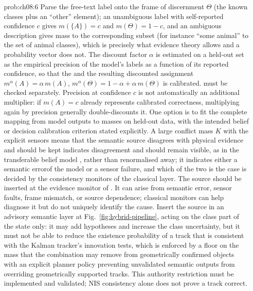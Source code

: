 \documentclass[graybox,envcountchap]{style/SNmono}
\providecommand{\DIFadd}[1]{{\protect\color{blue} #1}} %
\providecommand{\DIFdel}[1]{{\protect\color{red} #1}} %
\providecommand{\DIFaddbegin}{} %
\providecommand{\DIFaddend}{} %
\providecommand{\DIFdelbegin}{} %
\providecommand{\DIFdelend}{} %
\begin{document}
\begin{sol}{prob:ch08:6}
Parse the free-text label onto the frame of discernment $\Theta$ (the known classes plus an ``other'' element); an unambiguous label with self-reported confidence $c$ gives $m(\{A\})=c$ and $m(\Theta)=1-c$, and an ambiguous description gives mass to the corresponding subset (for instance ``some animal'' to the set of animal classes), which is precisely what evidence theory allows and a probability vector does not. The discount factor $\alpha$ is estimated on a held-out set as the empirical precision of the model's labels as a function of its reported confidence, \DIFdelbegin \DIFdel{so that the }\DIFdelend \DIFaddbegin \DIFadd{and the resulting }\DIFaddend discounted assignment $m^\alpha(A)=\alpha\,m(A)$, $m^\alpha(\Theta)=1-\alpha+\alpha\,m(\Theta)$ \DIFdelbegin \DIFdel{is calibrated. }\DIFdelend \DIFaddbegin \DIFadd{must be checked separately. Precision at confidence $c$ is not automatically an additional multiplier: if $m(A)=c$ already represents calibrated correctness, multiplying again by precision generally double-discounts it. One option is to fit the complete mapping from model outputs to masses on held-out data, with the intended belief or decision calibration criterion stated explicitly. }\DIFaddend A large conflict mass $K$ \DIFdelbegin \DIFdel{with the explicit sensors means that the semantic source disagrees with physical evidence and should be kept }\DIFdelend \DIFaddbegin \DIFadd{indicates disagreement and should remain }\DIFaddend visible, as in the transferable belief model\DIFdelbegin \DIFdel{, rather than renormalised away; it indicates either a semantic errorof the model or a sensor failure, and which of the two is the case is decided by the consistency monitors of the classical layer. The source should be inserted at the evidence monitor of }\DIFdelend \DIFaddbegin \DIFadd{. It can arise from semantic error, sensor faults, frame mismatch, or source dependence; classical monitors can help diagnose it but do not uniquely identify the cause. Insert the source in an advisory semantic layer at }\DIFaddend Fig.~\ref{fig:hybrid-pipeline}, \DIFdelbegin \DIFdel{acting on the class part of the state only: it may add hypotheses and increase the class uncertainty, but it must not be able to reduce the existence probability of a track that is consistent with the Kalman tracker's innovation tests, which is enforced by a floor on the mass that the combination may remove from geometrically confirmed objects}\DIFdelend \DIFaddbegin \DIFadd{with an explicit planner policy preventing unvalidated semantic outputs from overriding geometrically supported tracks. This authority restriction must be implemented and validated; NIS consistency alone does not prove a track correct}\DIFaddend .
\end{sol}
\end{document}
